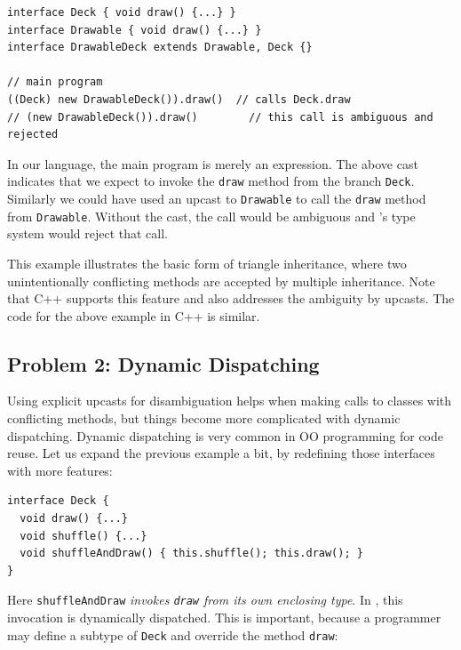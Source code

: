 \vspace{3pt}\begin{lstlisting}
interface Deck { void draw() {...} }
interface Drawable { void draw() {...} }
interface DrawableDeck extends Drawable, Deck {}

// main program
((Deck) new DrawableDeck()).draw()  // calls Deck.draw
// (new DrawableDeck()).draw()        // this call is ambiguous and rejected
\end{lstlisting}\vspace{3pt}
In our language, the main program is merely an expression. The above cast indicates
that we expect to invoke the \lstinline|draw| method from the branch
\lstinline|Deck|. Similarly we could have used an upcast to \lstinline|Drawable|
to call the \lstinline|draw| method from \lstinline|Drawable|.
Without the cast, the call would be ambiguous and
\MIM{}'s type system would reject that call. 

This example illustrates the basic form of triangle inheritance, where two unintentionally conflicting methods
are accepted by multiple inheritance. Note that C++ supports this feature and also addresses the
ambiguity by upcasts. The code for the above example in C++ is similar. 


\subsection{Problem 2: Dynamic Dispatching}\label{subsec:problem2}
Using explicit upcasts for disambiguation helps when making calls to
classes with conflicting methods, but things
become more complicated with dynamic dispatching. Dynamic
dispatching is very common in OO programming for code reuse. Let us expand the previous
example a bit, by redefining those interfaces with more features:

\vspace{3pt}\begin{lstlisting}
interface Deck {
  void draw() {...}
  void shuffle() {...}
  void shuffleAndDraw() { this.shuffle(); this.draw(); }
}
\end{lstlisting}\vspace{3pt}
Here \lstinline|shuffleAndDraw| \emph{invokes \lstinline|draw| from its own enclosing type}. In \MIM{}, this invocation is dynamically dispatched. This is important, because a programmer may define a subtype
of \lstinline|Deck| and override the method \lstinline|draw|:

